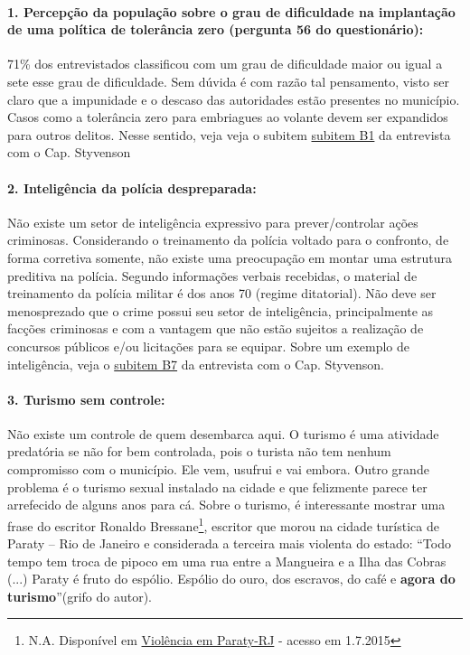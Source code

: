 \documentclass[
	12pt,				%
	openright,			%
	twoside,			%
	a4paper,			%
	chapter=TITLE,		%
	section=TITLE,		%
	subsection=TITLE,	%
	subsubsection=TITLE,%
	spanish,            %
	english,			%
	brazil				%
	]{abntex2}
\begin{document}
\paragraph*{\textbf{1. Percepção da população sobre o grau de dificuldade na implantação de uma política de tolerância zero (pergunta 56 do questionário):}} 71\% dos entrevistados classificou com um grau de dificuldade maior ou igual a sete esse grau de dificuldade. Sem dúvida é com razão tal pensamento, visto ser claro que a impunidade e o descaso das autoridades estão presentes no município. Casos como a tolerância zero para embriagues ao volante devem ser expandidos para outros delitos. Nesse sentido, veja veja o subitem \hyperlink{B1}{subitem B1} da entrevista com o Cap. Styvenson 
\hypertarget{W2}{}
\paragraph*{\textbf{2. Inteligência da polícia despreparada:}} Não existe um setor de inteligência expressivo para prever/controlar ações criminosas. Considerando o treinamento da polícia voltado para o confronto, de forma corretiva somente, não existe uma preocupação em montar uma estrutura preditiva na polícia. Segundo informações verbais recebidas, o material de treinamento da polícia militar é dos anos 70 (regime ditatorial). Não deve ser menosprezado que o crime possui seu setor de inteligência, principalmente as facções criminosas e com a vantagem que não estão
sujeitos a realização de concursos públicos e/ou licitações para se equipar. Sobre um exemplo de inteligência, veja o \hyperlink{B7}{subitem B7} da entrevista com o Cap. Styvenson.
\hypertarget{W3}{}
\paragraph*{\textbf{3. Turismo sem controle:}} Não existe um controle de quem desembarca aqui. O turismo é uma atividade predatória se não for bem controlada, pois o turista não tem nenhum compromisso com o município. Ele vem, usufrui e vai embora. Outro grande problema é o turismo sexual instalado na cidade e que felizmente parece ter arrefecido de alguns anos para cá. Sobre o turismo, é interessante mostrar uma frase do escritor Ronaldo Bressane\footnote{N.A. Disponível em \href{http://entretenimento.uol.com.br/noticias/redacao/2015/07/04/violencia-em-paraty-o-que-roberto-saviano-temeria-para-nao-vir-a-flip.htm}{Violência em Paraty-RJ} - acesso em 1.7.2015}, escritor que morou na cidade turística de Paraty – Rio de Janeiro e considerada a terceira mais violenta do estado: “Todo tempo tem troca de pipoco em uma rua entre a Mangueira e a Ilha das Cobras (...) Paraty é fruto do espólio. Espólio do ouro, dos escravos, do café e \textbf{agora do turismo}”(grifo do autor).
\hypertarget{W4}{}
\end{document}
